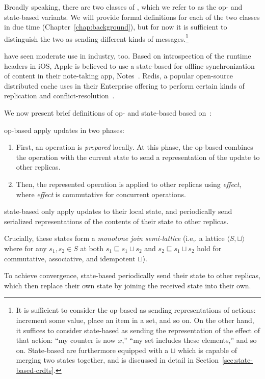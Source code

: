 Broadly speaking, there are two classes of \CRDTs, which we refer to as the op-
and state-based variants. We will provide formal definitions for each of the two
classes in due time (Chapter~\ref{chap:background}), but for now it is
sufficient to distinguish the two as sending different kinds of
messages.\footnote{It is sufficient to consider the op-based \CRDT as sending
representations of actions: increment some value, place an item in a set, and so
on. On the other hand, it suffices to consider state-based \CRDTs as sending the
representation of the effect of that action: ``my counter is now $x$,'' ``my set
includes these elements,'' and so on. State-based \CRDTs are furthermore
equipped with a $\sqcup$ which is capable of merging two states together, and is
discussed in detail in Section~\ref{sec:state-based-crdts}.}

\CRDTs have seen moderate use in industry, too. Based on introspection of the
runtime headers in iOS, Apple is believed to use a state-based \CRDT for offline
synchronization of content in their note-taking app, Notes~\citep{applenotes}.
Redis, a popular open-source distributed cache uses \CRDTs in their Enterprise
offering to perform certain kinds of replication and
conflict-resolution~\citep{redis}.

We now present brief definitions of op- and state-based \CRDTs based
on~\citet{baquero14}:

\begin{definition}
  op-based \CRDTs apply updates in two phases:
  \begin{enumerate}
    \item First, an operation is \emph{prepared} locally. At this phase, the
      op-based \CRDT combines the operation with the current state to send a
      representation of the update to other replicas.
    \item Then, the represented operation is applied to other replicas using
      \emph{effect}, where \emph{effect} is commutative for concurrent
      operations.
  \end{enumerate}
\end{definition}

\begin{definition}
  state-based \CRDTs only apply updates to their local state, and periodically
  send serialized representations of the contents of their state to other
  replicas.

  Crucially, these states form a \textit{monotone join semi-lattice} (i.e,. a
  lattice $\langle S, \sqcup \rangle$ where for any $s_1, s_2 \in S$ at both
  $s_1 \sqsubseteq s_1 \sqcup s_2$ and $s_2 \sqsubseteq s_1 \sqcup s_2$ hold for
  commutative, associative, and idempotent $\sqcup$).

  To achieve convergence, state-based \CRDTs periodically send their state to
  other replicas, which then replace their own state by joining the received
  state into their own.
\end{definition}

